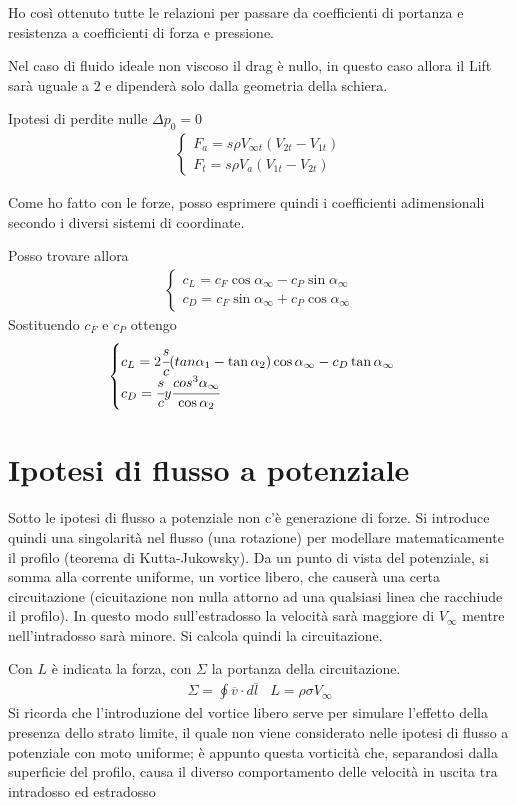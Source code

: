 Ho così ottenuto tutte le relazioni per passare da coefficienti di portanza e resistenza a coefficienti di forza e pressione.

Nel caso di fluido ideale non viscoso il drag è nullo, in questo caso allora il Lift sarà uguale a $2$ e dipenderà solo dalla geometria della schiera. 

Ipotesi di perdite nulle $\Delta p_0 = 0$
\begin{align*}
\begin{cases}
F_a = s \rho V_{\infty t} (V_{2t}-V_{1t})\\
F_t = s \rho V_a (V_{1t}-V_{2t})
\end{cases}
\end{align*}

Come ho fatto con le forze, posso esprimere quindi i coefficienti adimensionali secondo i diversi sistemi di coordinate. 

Posso trovare allora
\begin{align*}
\begin{cases}
c_L = c_F \cos \alpha_{\infty} - c_P \sin \alpha_{\infty} \\
c_D = c_F \sin \alpha_{\infty} + c_P \cos \alpha_{\infty}
\end{cases}
\end{align*}
Sostituendo $c_F$ e $c_P$ ottengo
\begin{align*}
\begin{cases}
c_L = 2 \cfrac{s}{c} (tan \alpha_1 - \tan \alpha_2) \cos \alpha_{\infty} - c_D \tan \alpha_{\infty} \\
c_D = \cfrac{s}{c} y \cfrac{cos^3 \alpha_{\infty}}{\cos \alpha_2}
\end{cases}
\end{align*}
\section{Ipotesi di flusso a potenziale}
Sotto le ipotesi di flusso a potenziale non c'è generazione di forze. Si introduce quindi una singolarità nel flusso (una rotazione) per modellare matematicamente il profilo (teorema di Kutta-Jukowsky). Da un punto di vista del potenziale, si somma alla corrente uniforme, un vortice libero, che causerà una certa circuitazione (cicuitazione non nulla attorno ad una qualsiasi linea che racchiude il profilo). In questo modo sull'estradosso la velocità sarà maggiore di $V_{\infty}$ mentre nell'intradosso sarà minore. Si calcola quindi la circuitazione. 

Con $L$ è indicata la forza, con $\Sigma$ la portanza della circuitazione.
\begin{align*}
\Sigma = \oint \overline{v} \cdot d \overline{l} \;\;\; L = \rho \sigma V_{\infty}
\end{align*}
Si ricorda che l'introduzione del vortice libero serve per simulare l'effetto della presenza dello strato limite, il quale non viene considerato nelle ipotesi di flusso a potenziale con moto uniforme; è appunto questa vorticità che, separandosi dalla superficie del profilo, causa il diverso comportamento delle velocità in uscita tra intradosso ed estradosso

